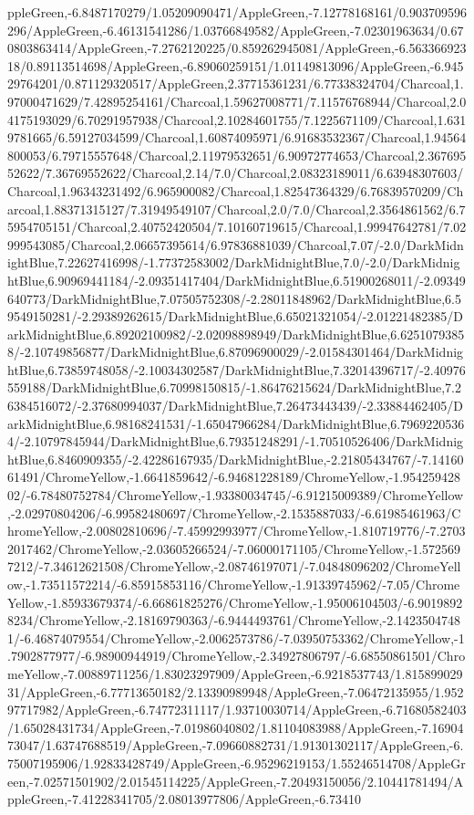{\begin{tikzternal}
ppleGreen,-6.8487170279/1.05209090471/AppleGreen,-7.12778168161/0.903709596296/AppleGreen,-6.46131541286/1.03766849582/AppleGreen,-7.02301963634/0.670803863414/AppleGreen,-7.2762120225/0.859262945081/AppleGreen,-6.56336692318/0.89113514698/AppleGreen,-6.89060259151/1.01149813096/AppleGreen,-6.94529764201/0.871129320517/AppleGreen,2.37715361231/6.77338324704/Charcoal,1.97000471629/7.42895254161/Charcoal,1.59627008771/7.11576768944/Charcoal,2.04175193029/6.70291957938/Charcoal,2.10284601755/7.1225671109/Charcoal,1.6319781665/6.59127034599/Charcoal,1.60874095971/6.91683532367/Charcoal,1.94564800053/6.79715557648/Charcoal,2.11979532651/6.90972774653/Charcoal,2.36769552622/7.36769552622/Charcoal,2.14/7.0/Charcoal,2.08323189011/6.63948307603/Charcoal,1.96343231492/6.965900082/Charcoal,1.82547364329/6.76839570209/Charcoal,1.88371315127/7.31949549107/Charcoal,2.0/7.0/Charcoal,2.3564861562/6.75954705151/Charcoal,2.40752420504/7.10160719615/Charcoal,1.99947642781/7.02999543085/Charcoal,2.06657395614/6.97836881039/Charcoal,7.07/-2.0/DarkMidnightBlue,7.22627416998/-1.77372583002/DarkMidnightBlue,7.0/-2.0/DarkMidnightBlue,6.90969441184/-2.09351417404/DarkMidnightBlue,6.51900268011/-2.09349640773/DarkMidnightBlue,7.07505752308/-2.28011848962/DarkMidnightBlue,6.59549150281/-2.29389262615/DarkMidnightBlue,6.65021321054/-2.01221482385/DarkMidnightBlue,6.89202100982/-2.02098898949/DarkMidnightBlue,6.62510793858/-2.10749856877/DarkMidnightBlue,6.87096900029/-2.01584301464/DarkMidnightBlue,6.73859748058/-2.10034302587/DarkMidnightBlue,7.32014396717/-2.40976559188/DarkMidnightBlue,6.70998150815/-1.86476215624/DarkMidnightBlue,7.26384516072/-2.37680994037/DarkMidnightBlue,7.26473443439/-2.33884462405/DarkMidnightBlue,6.98168241531/-1.65047966284/DarkMidnightBlue,6.79692205364/-2.10797845944/DarkMidnightBlue,6.79351248291/-1.70510526406/DarkMidnightBlue,6.8460909355/-2.42286167935/DarkMidnightBlue,-2.21805434767/-7.1416061491/ChromeYellow,-1.6641859642/-6.94681228189/ChromeYellow,-1.95425942802/-6.78480752784/ChromeYellow,-1.93380034745/-6.91215009389/ChromeYellow,-2.02970804206/-6.99582480697/ChromeYellow,-2.1535887033/-6.61985461963/ChromeYellow,-2.00802810696/-7.45992993977/ChromeYellow,-1.810719776/-7.27032017462/ChromeYellow,-2.03605266524/-7.06000171105/ChromeYellow,-1.5725697212/-7.34612621508/ChromeYellow,-2.08746197071/-7.04848096202/ChromeYellow,-1.73511572214/-6.85915853116/ChromeYellow,-1.91339745962/-7.05/ChromeYellow,-1.85933679374/-6.66861825276/ChromeYellow,-1.95006104503/-6.90198928234/ChromeYellow,-2.18169790363/-6.9444493761/ChromeYellow,-2.14235047481/-6.46874079554/ChromeYellow,-2.0062573786/-7.03950753362/ChromeYellow,-1.7902877977/-6.98900944919/ChromeYellow,-2.34927806797/-6.68550861501/ChromeYellow,-7.00889711256/1.83023297909/AppleGreen,-6.9218537743/1.81589902931/AppleGreen,-6.77713650182/2.13390989948/AppleGreen,-7.06472135955/1.95297717982/AppleGreen,-6.74772311117/1.93710030714/AppleGreen,-6.71680582403/1.65028431734/AppleGreen,-7.01986040802/1.81104083988/AppleGreen,-7.1690473047/1.63747688519/AppleGreen,-7.09660882731/1.91301302117/AppleGreen,-6.75007195906/1.92833428749/AppleGreen,-6.95296219153/1.55246514708/AppleGreen,-7.02571501902/2.01545114225/AppleGreen,-7.20493150056/2.10441781494/AppleGreen,-7.41228341705/2.08013977806/AppleGreen,-6.73410
\end{tikzternal}}

